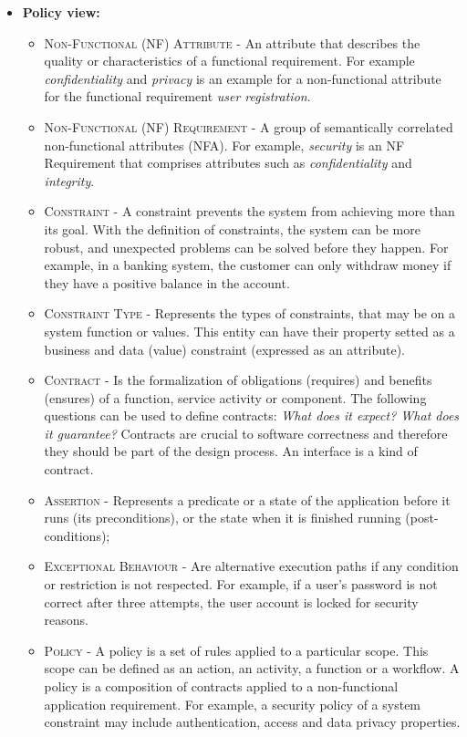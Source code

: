 \begin{itemize}
\item \textbf{Policy view:}		
	\begin{itemize}
		  \item \textsc{Non-Functional (NF) Attribute -} An attribute that describes
		the quality or characteristics of a functional requirement. For example
		\textit{confidentiality} and \textit{privacy} is an example for a non-functional
		attribute for the functional requirement \textit{user registration}.
		  \item \textsc{Non-Functional (NF) Requirement -} A group of semantically
		correlated non-functional attributes (NFA). For example, \textit{security} is
		an NF Requirement that comprises attributes such as \textit{confidentiality}
		and \textit{integrity}.
		  \item \textsc{Constraint -} A constraint prevents the system
		  from achieving more than its goal. With the definition of constraints, the
		  system  can be more robust, and unexpected problems can be solved before they
		  happen. For example, in a banking system, the customer can only withdraw
		  money if they have a positive balance in the account.
		    \item \textsc{Constraint Type -} Represents the types of constraints, that
		    may be on a system function or values. This entity can have their
		    property setted as a business and data (value) constraint (expressed as an
		    attribute). 
		  \item \textsc{Contract -} Is the formalization of obligations (requires) and
		  benefits (ensures) of a function, service activity or component.
		  The following questions can be used to define contracts: \textit{What does it
		  expect? What does it guarantee?} Contracts are crucial to software correctness
		  and therefore they should be part of the design process. An interface is a
		  kind of contract.
		  \item \textsc{Assertion -} Represents a predicate or a state of the
		  application before it runs (its preconditions), or the state when it is
		  finished running (post-conditions);
		  \item \textsc{Exceptional Behaviour -} Are alternative execution paths if
		  any condition or restriction is not respected. For example, if a user's
		  password is not correct after three attempts, the user account is locked for
		  security reasons.
		  \item \textsc{Policy -} A policy is a set of rules applied to a particular
		  scope. This scope can be defined as an action, an activity, a function or a
		  workflow. A policy is a composition of contracts applied to a non-functional
		  application requirement. For example, a security policy of a system constraint
		  may include authentication, access and data privacy properties.


\end{itemize}
\end{itemize}
